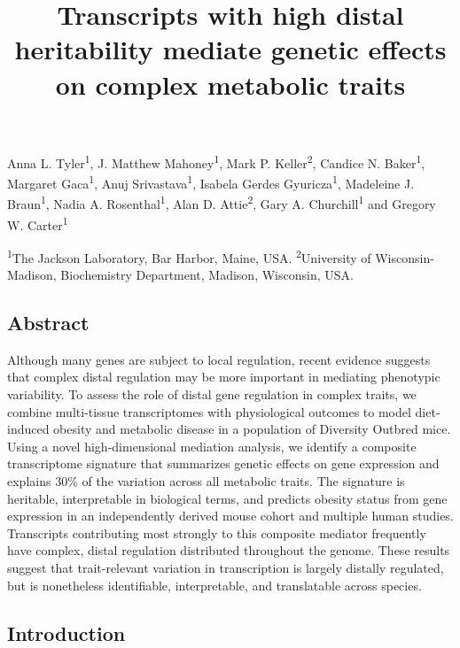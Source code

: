 \documentclass[
]{article}
\title{Transcripts with high distal heritability mediate genetic effects
on complex metabolic traits}
\author{}
\date{\vspace{-2.5em}}
\begin{document}
\maketitle

Anna L. Tyler\textsuperscript{1}, J. Matthew Mahoney\textsuperscript{1},
Mark P. Keller\textsuperscript{2}, Candice N. Baker\textsuperscript{1},
Margaret Gaca\textsuperscript{1}, Anuj Srivastava\textsuperscript{1},
Isabela Gerdes Gyuricza\textsuperscript{1}, Madeleine J.
Braun\textsuperscript{1}, Nadia A. Rosenthal\textsuperscript{1}, Alan D.
Attie\textsuperscript{2}, Gary A. Churchill\textsuperscript{1} and
Gregory W. Carter\textsuperscript{1}

\textsuperscript{1}The Jackson Laboratory, Bar Harbor, Maine, USA.
\textsuperscript{2}University of Wisconsin-Madison, Biochemistry
Department, Madison, Wisconsin, USA.

\subsection{Abstract}\label{abstract}

Although many genes are subject to local regulation, recent evidence
suggests that complex distal regulation may be more important in
mediating phenotypic variability. To assess the role of distal gene
regulation in complex traits, we combine multi-tissue transcriptomes
with physiological outcomes to model diet-induced obesity and metabolic
disease in a population of Diversity Outbred mice. Using a novel
high-dimensional mediation analysis, we identify a composite
transcriptome signature that summarizes genetic effects on gene
expression and explains 30\% of the variation across all metabolic
traits. The signature is heritable, interpretable in biological terms,
and predicts obesity status from gene expression in an independently
derived mouse cohort and multiple human studies. Transcripts
contributing most strongly to this composite mediator frequently have
complex, distal regulation distributed throughout the genome. These
results suggest that trait-relevant variation in transcription is
largely distally regulated, but is nonetheless identifiable,
interpretable, and translatable across species.

\subsection{Introduction}\label{introduction}
\end{document}
